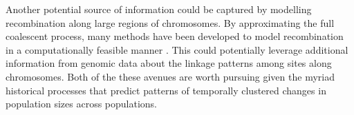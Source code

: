 Another potential source of information could be captured by modelling
recombination along large regions of chromosomes.
By approximating the full coalescent process, many methods have been developed
to model recombination in a computationally feasible manner
\citep{McVean2005,Marjoram2006,Chen2009,Li2011,Sheehan2013,Schiffels2014,Rasmussen2014,Palacios2015}.
This could potentially leverage additional information from genomic data about the
linkage patterns among sites along chromosomes.
Both of the these avenues are worth pursuing given the myriad historical
processes that predict patterns of temporally clustered changes in population
sizes across populations.
